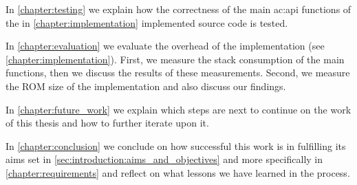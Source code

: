 In \autoref{chapter:testing} we explain how the correctness of the main \gls{ac:api} functions of the in \autoref{chapter:implementation} implemented source code is tested.

In \autoref{chapter:evaluation} we evaluate the overhead of the  implementation (see \autoref{chapter:implementation}).
First, we measure the stack consumption of the main  functions, then we discuss the results of these measurements.
Second, we measure the ROM size of the  implementation and also discuss our findings.

In \autoref{chapter:future_work} we explain which steps are next to continue on the work of this thesis and how to further iterate upon it.

In \autoref{chapter:conclusion} we conclude on how successful this work is in fulfilling its aims set in \autoref{sec:introduction:aims_and_objectives} and more specifically in \autoref{chapter:requirements} and reflect on what lessons we have learned in the process.
